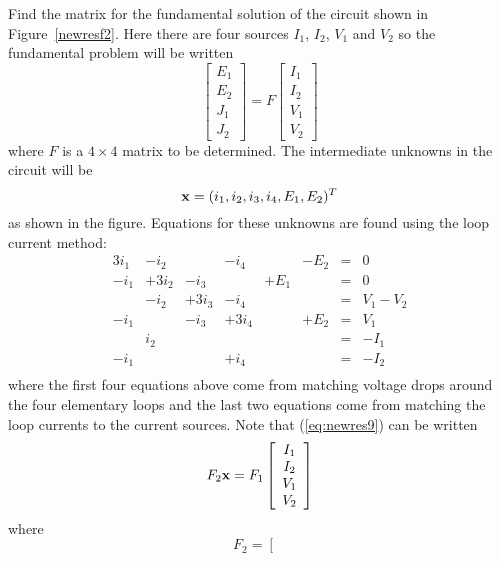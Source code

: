 \begin{example}
\label{newresex} Find the matrix for the fundamental solution of the 
circuit shown in Figure~\ref{newresf2}.
{\rm 
Here there are four sources $I_1$, $I_2$, $V_1$ and $V_2$ so the 
fundamental problem will be written 
\begin{equation}
\label{eq:newres8}
\left[ \begin{array}{c} E_1 \\ E_2 \\ J_1 \\ J_2  \end{array} \right] =  F 
\left[ \begin{array}{c} I_1 \\ I_2 \\ V_1 \\ V_2  \end{array} \right] 
\end{equation}
where $F$ is a $4 \times 4$ matrix to be determined. The intermediate 
unknowns in the circuit will be 
\[
{\bf x} = (i_1, i_2, i_3, i_4, E_1, E_2)^T
\]
as shown in the figure. Equations for these unknowns are found using the 
loop current method:
\begin{equation}
\label{eq:newres9}
\begin{array}{cccccccc}
3i_1 & -i_2 & & -i_4& & -E_2 &= & 0 \\
-i_1 & +3i_2 & -i_3&  & +E_1& & = & 0 \\
 & -i_2 & +3i_3& -i_4& &  &= & V_1-V_2 \\
-i_1 & & -i_3 & +3i_4& & +E_2& = & V_1 \\
 & i_2 & & & &  & = & -I_1 \\
-i_1 & & & +i_4& & & = & -I_2 \\
\end{array}
\end{equation}
where the first four equations above come from matching voltage 
drops around the four elementary loops and the last two equations come from 
matching the loop currents to the current sources. Note that (\ref{eq:newres9}) 
can be written
\begin{equation}
\label{eq:newres10}
F_2 {\bf x} = F_1 \left[ \begin{array}{c} I_1 \\ I_2 \\ V_1 \\ V_2 \end{array} \right]
\end{equation}
where
\[
F_2 = \left[ \begin{array}{cccccc} 

\end{array}\]}
\end{example}
